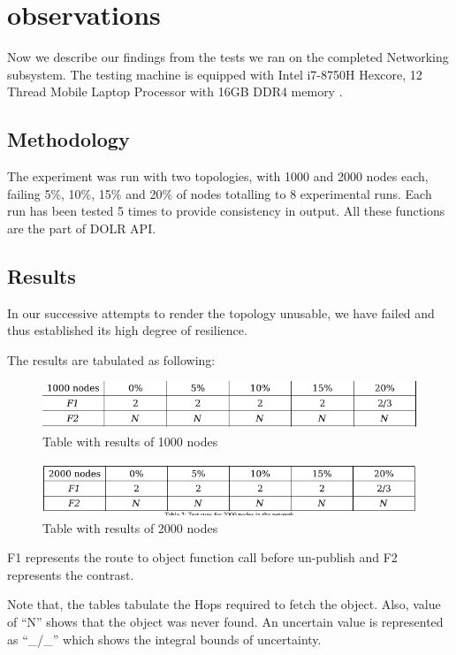 \documentclass[conference,a4paper,12pt]{IEEEtran}
\begin{document}
\section{observations}
Now we describe our findings from the tests we ran on the completed Networking subsystem. The testing machine is equipped with Intel i7-8750H Hexcore, 12 Thread Mobile Laptop Processor with 16GB DDR4 memory .

	\subsection{Methodology}
	The experiment was run with two topologies, with 1000 and 2000 nodes each,
failing 5\%, 10\%, 15\% and 20\% of nodes totalling to 8 experimental runs. Each run
has been tested 5 times to provide consistency in output. All these functions are the
part of DOLR API.

	\subsection{Results}
	In our successive attempts to render the topology unusable, we have failed and thus
established its high degree of resilience.

The results are tabulated as following:

	\begin{figure}[h]
	  \includegraphics[width=\linewidth]{../observations/test_1000_nodes.png}
	  \caption{Table with results of 1000 nodes}
	  \label{Test 1}
	\end{figure}
	
	\begin{figure}[h]
	  \includegraphics[width=\linewidth]{../observations/test_2000_nodes.png}
	  \caption{Table with results of 2000 nodes}
	  \label{Test 2}
	\end{figure}

F1 represents the route to object function call before un-publish and F2 represents the contrast.

Note that, the tables tabulate the Hops required to fetch the object. Also,
value of “N” shows that the object was never found. An uncertain value is
represented as ``\_/\_'' which shows the integral bounds of uncertainty.
\end{document}
